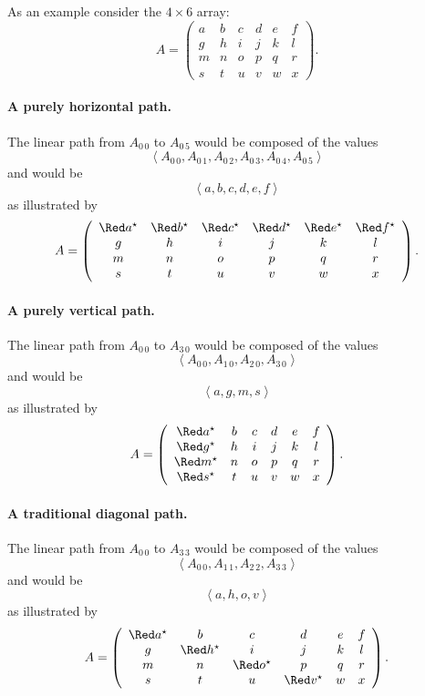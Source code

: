 As an example consider the $4 \times 6$ array:
$$A = \left(\begin{array}{cccccc}
a & b & c & d & e & f \\
g & h & i & j & k & l \\
m & n & o & p & q & r \\
s & t & u & v & w & x
\end{array}\right).$$

\paragraph{A purely horizontal path.}
The linear path from $A_{0\,0}$ to $A_{0\,5}$ would be composed of the values
$$\left< A_{0\,0}, A_{0\,1}, A_{0\,2}, A_{0\,3}, A_{0\,4}, A_{0\,5} \right>$$
and would be
$$\left< a, b, c, d, e, f \right>$$
as illustrated by
$$A = \left(\begin{array}{cccccc}
\apmk a & \apmk b & \apmk c & \apmk d & \apmk e & \apmk f \\
g & h & i & j & k & l \\
m & n & o & p & q & r \\
s & t & u & v & w & x
\end{array}\right).$$

\paragraph{A purely vertical path.}
The linear path from $A_{0\,0}$ to $A_{3\,0}$ would be composed of the values
$$\left< A_{0\,0}, A_{1\,0}, A_{2\,0}, A_{3\,0} \right>$$
and would be
$$\left< a, g, m, s \right>$$
as illustrated by
$$A = \left(\begin{array}{cccccc}
\apmk a & b & c & d & e & f \\
\apmk g & h & i & j & k & l \\
\apmk m & n & o & p & q & r \\
\apmk s & t & u & v & w & x
\end{array}\right).$$

\paragraph{A traditional diagonal path.}
The linear path from $A_{0\,0}$ to $A_{3\,3}$ would be composed of the values
$$\left< A_{0\,0}, A_{1\,1}, A_{2\,2}, A_{3\,3} \right>$$
and would be
$$\left< a, h, o, v \right>$$
as illustrated by
$$A = \left(\begin{array}{cccccc}
\apmk a & b & c & d & e & f \\
g & \apmk h & i & j & k & l \\
m & n & \apmk o & p & q & r \\
s & t & u & \apmk v & w & x
\end{array}\right).$$

